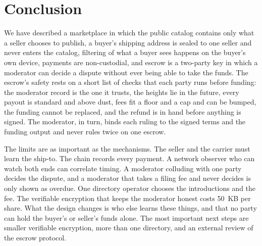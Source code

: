 \section{Conclusion}
\label{sec:conclusion}

We have described a marketplace in which the public catalog contains only what a seller chooses to publish, a buyer's shipping address is sealed to one seller and never enters the catalog, filtering of what a buyer sees happens on the buyer's own device, payments are non-custodial, and escrow is a two-party key in which a moderator can decide a dispute without ever being able to take the funds. The escrow's safety rests on a short list of checks that each party runs before funding: the moderator record is the one it trusts, the heights lie in the future, every payout is standard and above dust, fees fit a floor and a cap and can be bumped, the funding cannot be replaced, and the refund is in hand before anything is signed. The moderator, in turn, binds each ruling to the signed terms and the funding output and never rules twice on one escrow.

The limits are as important as the mechanisms. The seller and the carrier must learn the ship-to. The chain records every payment. A network observer who can watch both ends can correlate timing. A moderator colluding with one party decides the dispute, and a moderator that takes a filing fee and never decides is only shown as overdue. One directory operator chooses the introductions and the fee. The verifiable encryption that keeps the moderator honest costs 50~KB per share. What the design changes is who else learns these things, and that no party can hold the buyer's or seller's funds alone. The most important next steps are smaller verifiable encryption, more than one directory, and an external review of the escrow protocol.
